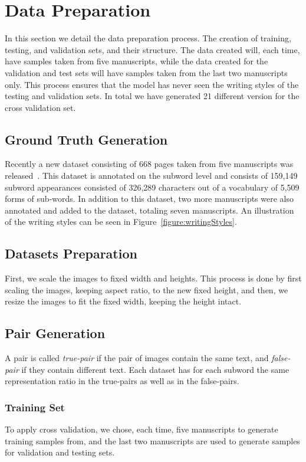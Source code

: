 \documentclass[10pt, a4paper, conference, compsocconf]{IEEEtran}
\begin{document}
\section{Data Preparation}
In this section we detail the data preparation process. The creation of training, testing, and validation sets, and their structure. The data created will, each time, have samples taken from five manuscripts, while the data created for the validation and test sets will have samples taken from the last two manuscripts only. This process ensures that the model has never seen the writing styles of the testing and validation sets. In total we have generated 21 different version for the cross validation set.

\subsection{Ground Truth Generation}
Recently a new dataset consisting of 668 pages taken from five manuscripts was released~\cite{kassis2017vmlhd}. This dataset is annotated on the subword level and consists of 159,149 subword appearances consisted of 326,289 characters out of a vocabulary of 5,509 forms of sub-words. In addition to this dataset, two more manuscripts were also annotated and added to the dataset, totaling seven manuscripts. An illustration of the writing styles can be seen in Figure~\ref{figure:writingStyles}.

\subsection{Datasets Preparation}
First, we scale the images to fixed width and heights. This process is done by first scaling the images, keeping aspect ratio, to the new fixed height, and then, we resize the images to fit the fixed width, keeping the height intact.

\subsection{Pair Generation}
A pair is called {\em true-pair} if the pair of images contain the same text, and {\em false-pair} if they contain different text. Each dataset has for each subword the same representation ratio in the true-pairs as well as in the false-pairs.

\subsubsection{Training Set}
To apply cross validation, we chose, each time, five manuscripts to generate training samples from, and the last two manuscripts are used to generate samples for validation and testing sets.
\end{document}
